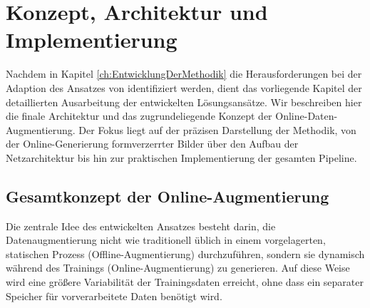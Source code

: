 \chapter{Konzept, Architektur und Implementierung}
\label{ch:KonzeptArchitekturImplementierung}
Nachdem in Kapitel \ref{ch:EntwicklungDerMethodik} die Herausforderungen bei der Adaption des Ansatzes von \textcite{He_2023_ICCV} identifiziert werden, dient das vorliegende Kapitel der detaillierten Ausarbeitung der entwickelten Lösungsansätze. Wir beschreiben hier die finale Architektur und das zugrundeliegende Konzept der Online-Daten-Augmentierung. Der Fokus liegt auf der präzisen Darstellung der Methodik, von der Online-Generierung formverzerrter Bilder über den Aufbau der Netzarchitektur bis hin zur praktischen Implementierung der gesamten Pipeline.




\section{Gesamtkonzept der Online-Augmentierung}
\label{sec:Gesamtkonzept}
Die zentrale Idee des entwickelten Ansatzes besteht darin, die Datenaugmentierung nicht wie traditionell üblich in einem vorgelagerten, statischen Prozess (Offline-Augmentierung) durchzuführen, sondern sie dynamisch während des Trainings (Online-Augmentierung) zu generieren. Auf diese Weise wird eine größere Variabilität der Trainingsdaten erreicht, ohne dass ein separater Speicher für vorverarbeitete Daten benötigt wird.

